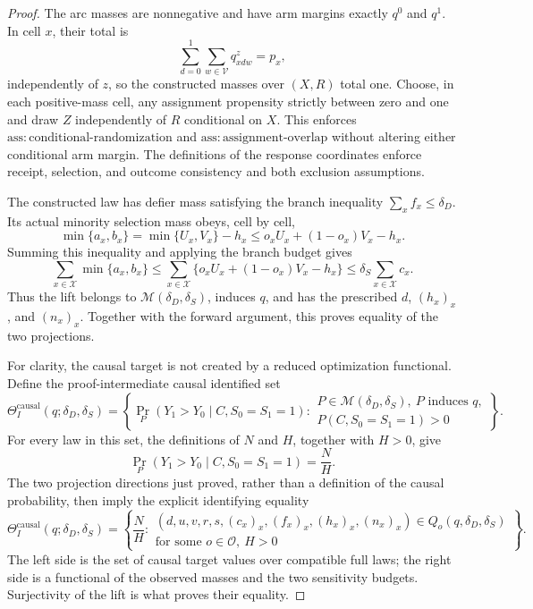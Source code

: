 \documentclass{article}
\begin{document}
\begin{proof}
The arc masses are nonnegative and have arm margins exactly \(q^0\) and \(q^1\).  In cell \(x\), their total is
\[
 \sum_{d=0}^1\sum_{w\in\mathcal V}q^z_{xdw}=p_x,
\]
independently of \(z\), so the constructed masses over \((X,R)\) total one.  Choose, in each positive-mass cell, any assignment propensity strictly between zero and one and draw \(Z\) independently of \(R\) conditional on \(X\).  This enforces \(\mathrm{ass:conditional\text{-}randomization}\) and \(\mathrm{ass:assignment\text{-}overlap}\) without altering either conditional arm margin.  The definitions of the response coordinates enforce receipt, selection, and outcome consistency and both exclusion assumptions.

The constructed law has defier mass satisfying the branch inequality \(\sum_xf_x\leq\delta_D\).  Its actual minority selection mass obeys, cell by cell,
\[
 \min\{a_x,b_x\}
 =\min\{U_x,V_x\}-h_x
 \leq o_xU_x+(1-o_x)V_x-h_x.
\]
Summing this inequality and applying the branch budget gives
\[
 \sum_{x\in\mathcal X}\min\{a_x,b_x\}
 \leq
 \sum_{x\in\mathcal X}\{o_xU_x+(1-o_x)V_x-h_x\}
 \leq\delta_S\sum_{x\in\mathcal X}c_x.
\]
Thus the lift belongs to \(\mathcal M(\delta_D,\delta_S)\), induces \(q\), and has the prescribed \(d\), \((h_x)_x\), and \((n_x)_x\).  Together with the forward argument, this proves equality of the two projections.

For clarity, the causal target is not created by a reduced optimization functional.  Define the proof-intermediate causal identified set
\[
 \Theta_I^{\mathrm{causal}}(q;\delta_D,\delta_S)
 =\left\{
 \Pr_P(Y_1>Y_0\mid C,S_0=S_1=1):
 \begin{array}{l}
 P\in\mathcal M(\delta_D,\delta_S),\ P\text{ induces }q,\\
 P(C,S_0=S_1=1)>0
 \end{array}
 \right\}.
\]
For every law in this set, the definitions of \(N\) and \(H\), together with \(H>0\), give
\[
 \Pr_P(Y_1>Y_0\mid C,S_0=S_1=1)=\frac{N}{H}.
\]
The two projection directions just proved, rather than a definition of the causal probability, then imply the explicit identifying equality
\[
 \Theta_I^{\mathrm{causal}}(q;\delta_D,\delta_S)
 =\left\{\frac NH:
 \begin{array}{l}
 (d,u,v,r,s,(c_x)_x,(f_x)_x,(h_x)_x,(n_x)_x)
 \in Q_o(q,\delta_D,\delta_S)\\
 \text{for some }o\in\mathcal O,\ H>0
 \end{array}
 \right\}.
\]
The left side is the set of causal target values over compatible full laws; the right side is a functional of the observed masses and the two sensitivity budgets.  Surjectivity of the lift is what proves their equality.


\end{proof}
\end{document}
